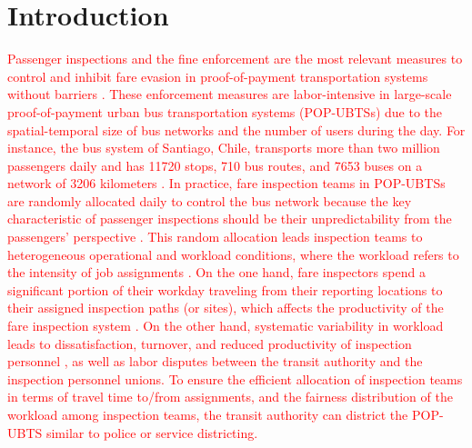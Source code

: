 \documentclass[preprint,11pt]{elsarticle}
\begin{document}
\section{Introduction} \label{sec:introduction}

\textcolor{red}{Passenger inspections and the fine enforcement are the most relevant measures to control and inhibit fare evasion in proof-of-payment transportation systems without barriers \citep{BARABINO2024101238, BARABINO2024100101,BARABINO2023100854, wolfgram2022measuring, multisystems2002toolkit}. 
These enforcement measures are labor-intensive in large-scale proof-of-payment urban bus transportation systems (POP-UBTSs) due to the spatial-temporal size of bus networks and the number of users during the day. 
For instance, the bus system of Santiago, Chile, transports more than two million passengers daily and has 11720 stops, 710 bus routes, and 7653 buses on a network of 3206 kilometers \citep{DTPM2025}.  
In practice, fare inspection teams in POP-UBTSs are randomly allocated daily to control the bus network because the key characteristic of passenger inspections should be their unpredictability from the passengers’ perspective \citep{Brotcorne2021, Escalona2024, Escalona2025}.  
This random allocation leads inspection teams to heterogeneous operational and workload conditions, where the workload refers to the intensity of job assignments \citep{nwinyokpugi2018workload}.
On the one hand, fare inspectors spend a significant portion of their workday traveling from their reporting locations to their assigned inspection paths (or sites), which affects the productivity of the fare inspection system \cite{NAP26514}. 
On the other hand, systematic variability in workload leads to dissatisfaction, turnover, and reduced productivity of inspection personnel \citep{inegbedion2020perception}, as well as labor disputes between the transit authority and the inspection personnel unions.
To ensure the efficient allocation of inspection teams in terms of travel time to/from assignments, and the fairness distribution of the workload among inspection teams, the transit authority can district the POP-UBTS similar to police or service districting.}
\end{document}
